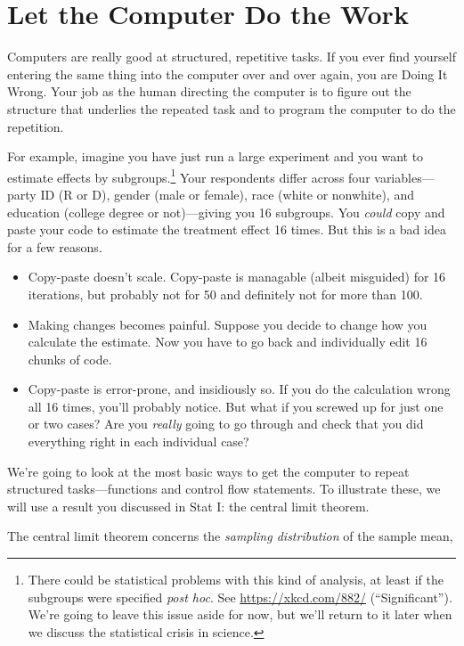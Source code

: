 \documentclass[12pt,oneside,openany]{book}
\let\rmarkdownfootnote\footnote%
\def\footnote{\protect\rmarkdownfootnote}
\begin{document}
\section{Let the Computer Do the
Work}\label{let-the-computer-do-the-work}

Computers are really good at structured, repetitive tasks. If you ever
find yourself entering the same thing into the computer over and over
again, you are Doing It Wrong. Your job as the human directing the
computer is to figure out the structure that underlies the repeated task
and to program the computer to do the repetition.

For example, imagine you have just run a large experiment and you want
to estimate effects by subgroups.\footnote{There could be statistical
  problems with this kind of analysis, at least if the subgroups were
  specified \emph{post hoc}. See \url{https://xkcd.com/882/}
  (``Significant''). We're going to leave this issue aside for now, but
  we'll return to it later when we discuss the statistical crisis in
  science.} Your respondents differ across four variables---party ID (R
or D), gender (male or female), race (white or nonwhite), and education
(college degree or not)---giving you 16 subgroups. You \emph{could} copy
and paste your code to estimate the treatment effect 16 times. But this
is a bad idea for a few reasons.

\begin{itemize}
\item
  Copy-paste doesn't scale. Copy-paste is managable (albeit misguided)
  for 16 iterations, but probably not for 50 and definitely not for more
  than 100.
\item
  Making changes becomes painful. Suppose you decide to change how you
  calculate the estimate. Now you have to go back and individually edit
  16 chunks of code.
\item
  Copy-paste is error-prone, and insidiously so. If you do the
  calculation wrong all 16 times, you'll probably notice. But what if
  you screwed up for just one or two cases? Are you \emph{really} going
  to go through and check that you did everything right in each
  individual case?
\end{itemize}

We're going to look at the most basic ways to get the computer to repeat
structured tasks---functions and control flow statements. To illustrate
these, we will use a result you discussed in Stat I: the central limit
theorem.

The central limit theorem concerns the \emph{sampling distribution} of
the sample mean,
\end{document}
